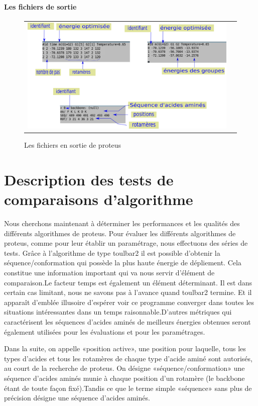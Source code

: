 \paragraph{Les fichiers de sortie}
   
   \begin{figure}[t]
     \centering
     \begin{tabular}{cc}
       \includegraphics[width=12cm]{graphe/proteus/output.png} &
     \end{tabular}
     
     \caption{Les fichiers en sortie de proteus}
\label{graph:struct_Phy}
   \end{figure}
   

\section{Description des tests de comparaisons d'algorithme} 
\label{sec:methodes_pratiques}
Nous cherchons maintenant à déterminer les performances et les qualités des différents algorithmes de proteus.
Pour évaluer les différents algorithmes de proteus, comme pour leur établir un paramétrage, nous effectuons des séries de tests. 
Grâce à l'algorithme de type toulbar2 il est possible d'obtenir la séquence/conformation qui possède la plus haute énergie de dépliement. Cela constitue une information important qui va nous servir d'élément de comparaison.Le facteur temps est également un élément déterminant. Il est dans certain cas limitant, nous ne savons pas à l'avance quand toulbar2 termine. Et il apparaît d'emblée illusoire d'espérer voir ce programme converger dans toutes les situations intéressantes dans un temps raisonnable.D'autres métriques qui caractérisent les séquences d'acides aminés de meilleurs énergies obtenues seront également utilisées pour les évaluations et pour les paramétrages.   

Dans la suite, on appelle «position active», une position pour laquelle, tous les types d'acides et tous les rotamères de chaque type d'acide aminé sont autorisés, au court de la recherche de proteus. On désigne «séquence/conformation» une séquence d'acides aminés munie à chaque position d'un rotamère (le backbone étant de toute façon fixé).Tandis ce que le terme simple «séquence»  sans plus de précision désigne une séquence d'acides aminés.



